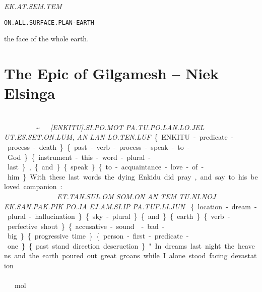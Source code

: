 {{\it EK.AT.SEM.TEM }

{\tt ON.ALL.SURFACE.PLAN-EARTH }

the face of the whole earth. 
\drie
\vfill

\pagebreak
\section{The Epic of Gilgamesh -- {\small Niek Elsinga}}



\drie
\drie
 

\cartouche{\en\ki\tu}\si\po\mot~\tu\po\lan\lo\jel~~ \\ \ut\es\set\on\lum\comma \an\lan\~\lo\ten\luf
 
{\it [ENKITU].SI.PO.MOT PA.TU.PO.LAN.LO.JEL \\UT.ES.SET.ON.LUM, AN LAN  LO.TEN.LUF}

\{ENKITU-predicate-process-death\} \{past-verb-process-speak-to-God\} \{instrument-this-word-plural-last\}, \{and\} \{speak\} \{to-acquaintance-love-of-him\} 

With these last words the dying Enkidu did pray, and say to his beloved companion:  

\drie 
 
\et\Atlantan\sul~ \som\on~\an~\tem~\tu\Atlanni\noj~\\ \ek\san\pak\pik~ ~\po\ja~\su~\ej\am\si\ip~\pa\tuf\li\jun 

{\it ET.TAN.SUL.OM SOM.ON AN TEM TU.NI.NOJ \\EK.SAN.PAK.PIK PO.JA EJ.AM.SI.IP PA.TUF.LI.JUN }

\{location-dream-plural-hallucination\} \{sky-plural\} \{and\} \{earth\} \{verb-perfective shout\} \{accusative-sound-bad-big\} \{progressive time\} \{person-first-predicate-one\} \{past stand direction descruction\}

"In dreams last night the heavens and the earth poured out great groans while I alone stood facing devastation.  

\drie 

\nik\si\tut\an\men\tef ~ \tu\pa\ful\et\ot ~ \li\ej\am ~ \Atlani\am\\ ~ \at\tu\pa\pus\ek\ej\am ~ \ut\nek\tak\on\ta\aj\\ ~ \lo\nap\mol\tef\ta\mot \Atlanin\es\na\cartouche{\il\kal\la} ~\\\comma\Atlanfi\tes\ta\Atlanne\las ~ \comma\aj\tu\jon

}
